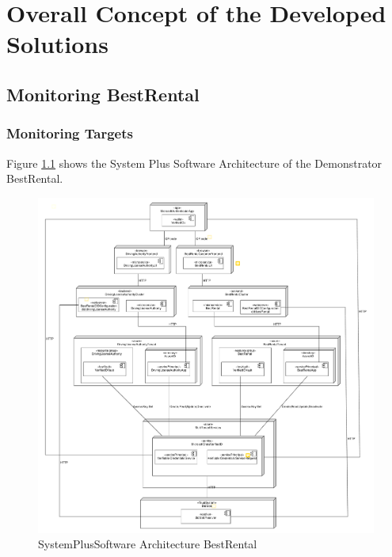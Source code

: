 \chapter{Overall Concept of the Developed Solutions}


\section{Monitoring BestRental}

\subsection{Monitoring Targets}

Figure \ref{fig:sps_architecture_bestrental} shows the System Plus Software Architecture of the Demonstrator BestRental.

\begin{figure}
	\centering
	\includegraphics[width=\textwidth]{pdfs/sps_achitecture_bestrental.pdf}
	\caption{SystemPlusSoftware Architecture BestRental}
	\label{fig:sps_architecture_bestrental}
\end{figure}

